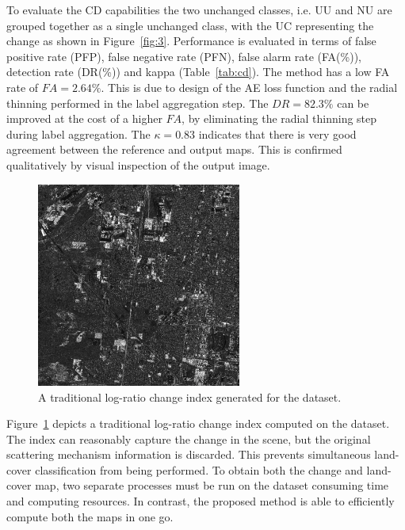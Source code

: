 To evaluate the CD capabilities the two unchanged classes, i.e. UU and NU are grouped together as a single unchanged class, with the UC representing the change as shown in Figure~\ref{fig:3}. Performance is evaluated in terms of false positive rate (PFP), false negative rate (PFN), false alarm rate (FA(\%)), detection rate (DR(\%)) and kappa (Table~\ref{tab:cd}). The method has a low FA rate of $FA=2.64\%$. This is due to design of the AE loss function and the radial thinning performed in the label aggregation step. The $DR=82.3\%$ can be improved at the cost of a higher $FA$, by eliminating the radial thinning step during label aggregation. The $\kappa=0.83$ indicates that there is very good agreement between the reference and output maps. This is confirmed qualitatively by visual inspection of the output image. 


\begin{figure}[t]
\centering
\includegraphics[width = 0.6\textwidth]{Figures/CD/ADD/Diff}
\caption{A traditional log-ratio change index generated for the dataset.}
\label{fig:difflr}
\end{figure}


Figure~\ref{fig:difflr} depicts a traditional log-ratio change index computed on the dataset. The index can reasonably capture the change in the scene, but the original scattering mechanism information is discarded. This prevents simultaneous land-cover classification from being performed. To obtain both the change and land-cover map, two separate processes must be run on the dataset consuming time and computing resources. In contrast, the proposed method is able to efficiently compute both the maps in one go. 

